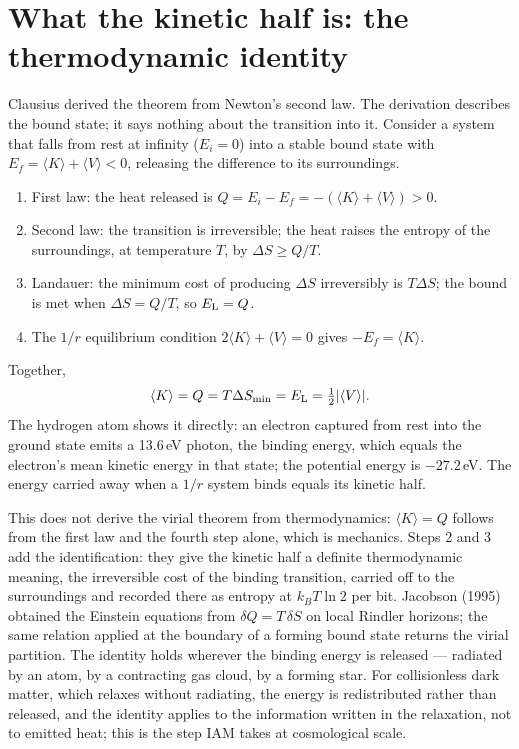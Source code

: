 \section{What the kinetic half is: the thermodynamic identity}
Clausius derived the theorem from Newton's second law. The derivation describes the bound state; it says nothing about the transition into it. Consider a
system that falls from rest at infinity ($E_i=0$) into a stable bound state with $E_f=\langle K\rangle+\langle V\rangle<0$, releasing the difference to its
surroundings.
\begin{enumerate}
\item First law: the heat released is $Q=E_i-E_f=-(\langle K\rangle+\langle V\rangle)>0$.
\item Second law: the transition is irreversible; the heat raises the entropy of the surroundings, at temperature $T$, by $\Delta S\ge Q/T$.
\item Landauer: the minimum cost of producing $\Delta S$ irreversibly is $T\Delta S$; the bound is met when $\Delta S=Q/T$, so $E_{\rm L}=Q$.
\item The $1/r$ equilibrium condition $2\langle K\rangle+\langle V\rangle=0$ gives $-E_f=\langle K\rangle$.
\end{enumerate}
Together,
\begin{equation}
\langle K\rangle=Q=T\Delta S_{\min}=E_{\rm L}=\tfrac12|\langle V\rangle| .
\end{equation}
The hydrogen atom shows it directly: an electron captured from rest into the ground state emits a 13.6\,eV photon, the binding energy, which equals the
electron's mean kinetic energy in that state; the potential energy is $-27.2$\,eV. The energy carried away when a $1/r$ system binds equals its kinetic half.

This does not derive the virial theorem from thermodynamics: $\langle K\rangle=Q$ follows from the first law and the fourth step alone, which is
mechanics. Steps 2 and 3 add the identification: they give the kinetic half a definite thermodynamic meaning, the irreversible cost of the binding transition, carried off to the surroundings and recorded there as entropy at
$k_BT\ln2$ per bit. Jacobson (1995) obtained the Einstein equations from $\delta Q=T\,\delta S$ on local Rindler horizons; the same relation applied at the
boundary of a forming bound state returns the virial partition. The identity holds wherever the binding energy is released --- radiated by an atom, by a
contracting gas cloud, by a forming star. For collisionless dark matter, which relaxes without radiating, the energy is redistributed rather than released,
and the identity applies to the information written in the relaxation, not to emitted heat; this is the step IAM takes at cosmological scale.
